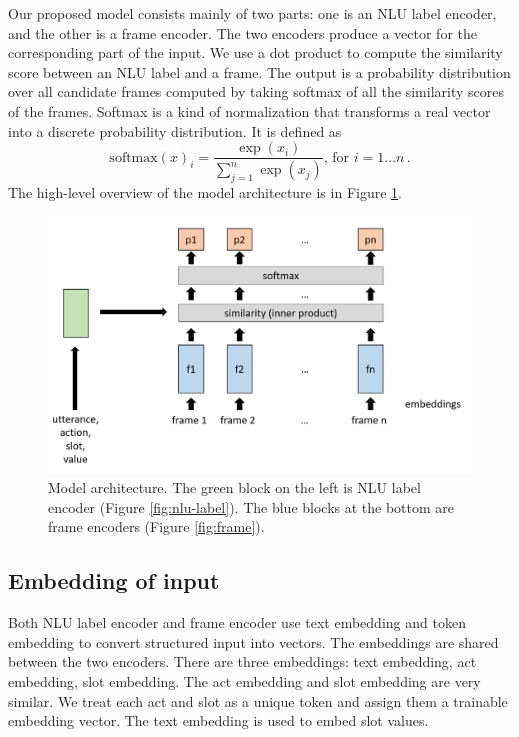 Our proposed model consists mainly of two parts: one is an NLU label encoder, and the other is a frame encoder. The two encoders produce a vector for the corresponding part of the input. We use a dot product to compute the similarity score between an NLU label and a frame. The output is a probability distribution over all candidate frames computed by taking softmax of all the similarity scores of the frames. Softmax is a kind of normalization that transforms a real vector into a discrete probability distribution. It is defined as
\begin{equation}\label{eq:softmax}
    \text{softmax}(x)_i = \frac{\exp(x_i)}{\sum_{j = 1}^{n}{\exp(x_j)}} \text{, for } i = 1 \dotsc n\,.
\end{equation}
The high-level overview of the model architecture is in Figure \ref{fig:main}.

\begin{figure}
    \centering
    \includegraphics[width=\columnwidth]{figures/main.png}
    \caption[Model architecture]{Model architecture. The green block on the left is NLU label encoder (Figure \ref{fig:nlu-label}). The blue blocks at the bottom are frame encoders (Figure \ref{fig:frame}).}
    \label{fig:main}
\end{figure}

\subsection{Embedding of input}
Both NLU label encoder and frame encoder use text embedding and token embedding to convert structured input into vectors. The embeddings are shared between the two encoders. There are three embeddings: text embedding, act embedding, slot embedding. The act embedding and slot embedding are very similar. We treat each act and slot as a unique token and assign them a trainable embedding vector. The text embedding is used to embed slot values. 

